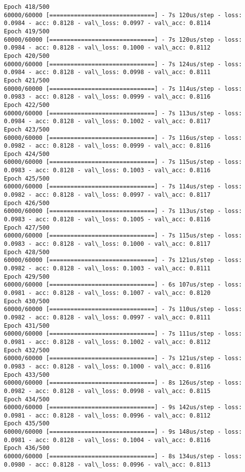 \documentclass[11pt]{article}
\begin{document}
\begin{Verbatim}[commandchars=\\\{\}]
Epoch 418/500
60000/60000 [==============================] - 7s 120us/step - loss: 0.0984 - acc: 0.8128 - val\_loss: 0.0997 - val\_acc: 0.8114
Epoch 419/500
60000/60000 [==============================] - 7s 120us/step - loss: 0.0984 - acc: 0.8128 - val\_loss: 0.1000 - val\_acc: 0.8112
Epoch 420/500
60000/60000 [==============================] - 7s 124us/step - loss: 0.0984 - acc: 0.8128 - val\_loss: 0.0998 - val\_acc: 0.8111
Epoch 421/500
60000/60000 [==============================] - 7s 114us/step - loss: 0.0983 - acc: 0.8128 - val\_loss: 0.0999 - val\_acc: 0.8116
Epoch 422/500
60000/60000 [==============================] - 7s 113us/step - loss: 0.0984 - acc: 0.8128 - val\_loss: 0.1002 - val\_acc: 0.8117
Epoch 423/500
60000/60000 [==============================] - 7s 116us/step - loss: 0.0982 - acc: 0.8128 - val\_loss: 0.0999 - val\_acc: 0.8116
Epoch 424/500
60000/60000 [==============================] - 7s 115us/step - loss: 0.0983 - acc: 0.8128 - val\_loss: 0.1003 - val\_acc: 0.8116
Epoch 425/500
60000/60000 [==============================] - 7s 114us/step - loss: 0.0982 - acc: 0.8128 - val\_loss: 0.0997 - val\_acc: 0.8117
Epoch 426/500
60000/60000 [==============================] - 7s 113us/step - loss: 0.0983 - acc: 0.8128 - val\_loss: 0.1005 - val\_acc: 0.8116
Epoch 427/500
60000/60000 [==============================] - 7s 115us/step - loss: 0.0983 - acc: 0.8128 - val\_loss: 0.1000 - val\_acc: 0.8117
Epoch 428/500
60000/60000 [==============================] - 7s 121us/step - loss: 0.0982 - acc: 0.8128 - val\_loss: 0.1003 - val\_acc: 0.8111
Epoch 429/500
60000/60000 [==============================] - 6s 107us/step - loss: 0.0981 - acc: 0.8128 - val\_loss: 0.1007 - val\_acc: 0.8120
Epoch 430/500
60000/60000 [==============================] - 7s 110us/step - loss: 0.0982 - acc: 0.8128 - val\_loss: 0.0997 - val\_acc: 0.8111
Epoch 431/500
60000/60000 [==============================] - 7s 111us/step - loss: 0.0981 - acc: 0.8128 - val\_loss: 0.1002 - val\_acc: 0.8112
Epoch 432/500
60000/60000 [==============================] - 7s 121us/step - loss: 0.0983 - acc: 0.8128 - val\_loss: 0.1000 - val\_acc: 0.8116
Epoch 433/500
60000/60000 [==============================] - 8s 126us/step - loss: 0.0982 - acc: 0.8128 - val\_loss: 0.0998 - val\_acc: 0.8115
Epoch 434/500
60000/60000 [==============================] - 9s 142us/step - loss: 0.0981 - acc: 0.8128 - val\_loss: 0.0996 - val\_acc: 0.8112
Epoch 435/500
60000/60000 [==============================] - 9s 148us/step - loss: 0.0981 - acc: 0.8128 - val\_loss: 0.1004 - val\_acc: 0.8116
Epoch 436/500
60000/60000 [==============================] - 8s 134us/step - loss: 0.0980 - acc: 0.8128 - val\_loss: 0.0996 - val\_acc: 0.8113

\end{Verbatim}
\end{document}
